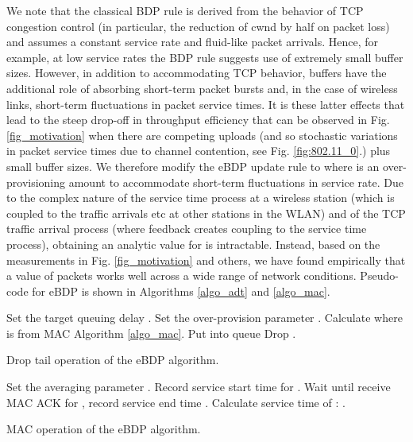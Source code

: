\documentclass[10pt,twocolumn, journal]{IEEEtran}
\begin{document}
We note that the classical BDP rule is derived from the behavior of TCP congestion control (in particular, the reduction of cwnd by half on packet loss) and assumes a constant service rate and fluid-like packet arrivals.  Hence, for example, at low service rates the BDP rule suggests use of extremely small buffer sizes.   However, in addition to accommodating TCP behavior, buffers have the additional role of absorbing short-term packet bursts and, in the case of wireless links, short-term fluctuations in packet service times.  It is these latter effects that lead to the steep drop-off in throughput efficiency that can be observed in Fig. \ref{fig_motivation}  when there are competing uploads (and so stochastic variations in packet service times due to channel contention, see Fig. \ref{fig:802.11_0}.) plus small buffer sizes.   We therefore modify the eBDP update rule to 
where  is an over-provisioning amount to accommodate short-term fluctuations in
service rate.  Due to the complex nature of the service time process at a wireless station (which is coupled to the traffic arrivals etc at other stations in the WLAN) and of the TCP traffic arrival process (where feedback creates coupling to the service time process), obtaining an analytic value for  is intractable.  Instead, based on the measurements in Fig. \ref{fig_motivation} and others, we have found empirically that a value of  packets works well across a wide range of network conditions. Pseudo-code for eBDP is shown in Algorithms \ref{algo_adt} and \ref{algo_mac}.



\begin{algorithm}[tb]
    \begin{algorithmic}[1]
        \STATE Set the target queuing delay .
        \STATE Set the over-provision parameter .
            \STATE Calculate  
            where  is from MAC Algorithm \ref{algo_mac}.
                \STATE Put  into queue
            \ELSE
                \STATE Drop .
            \ENDIF
        \ENDFOR
    \end{algorithmic}
    \caption{Drop tail operation of the eBDP algorithm.}
    \label{algo_adt}
\end{algorithm}

\begin{algorithm}[tb]
    \begin{algorithmic}[1]
        \STATE Set the averaging parameter .
            \STATE Record service start time  for .
            \STATE Wait until receive MAC ACK for , record service end time .
            \STATE Calculate service time of : .
        \ENDFOR
    \end{algorithmic}
    \caption{MAC operation of the eBDP algorithm.}
    \label{algo_mac}
\end{algorithm}
\end{document}
